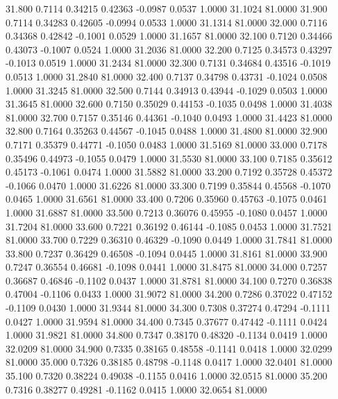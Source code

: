   31.800   0.7114   0.34215   0.42363  -0.0987   0.0537   1.0000  31.1024  81.0000
  31.900   0.7114   0.34283   0.42605  -0.0994   0.0533   1.0000  31.1314  81.0000
  32.000   0.7116   0.34368   0.42842  -0.1001   0.0529   1.0000  31.1657  81.0000
  32.100   0.7120   0.34466   0.43073  -0.1007   0.0524   1.0000  31.2036  81.0000
  32.200   0.7125   0.34573   0.43297  -0.1013   0.0519   1.0000  31.2434  81.0000
  32.300   0.7131   0.34684   0.43516  -0.1019   0.0513   1.0000  31.2840  81.0000
  32.400   0.7137   0.34798   0.43731  -0.1024   0.0508   1.0000  31.3245  81.0000
  32.500   0.7144   0.34913   0.43944  -0.1029   0.0503   1.0000  31.3645  81.0000
  32.600   0.7150   0.35029   0.44153  -0.1035   0.0498   1.0000  31.4038  81.0000
  32.700   0.7157   0.35146   0.44361  -0.1040   0.0493   1.0000  31.4423  81.0000
  32.800   0.7164   0.35263   0.44567  -0.1045   0.0488   1.0000  31.4800  81.0000
  32.900   0.7171   0.35379   0.44771  -0.1050   0.0483   1.0000  31.5169  81.0000
  33.000   0.7178   0.35496   0.44973  -0.1055   0.0479   1.0000  31.5530  81.0000
  33.100   0.7185   0.35612   0.45173  -0.1061   0.0474   1.0000  31.5882  81.0000
  33.200   0.7192   0.35728   0.45372  -0.1066   0.0470   1.0000  31.6226  81.0000
  33.300   0.7199   0.35844   0.45568  -0.1070   0.0465   1.0000  31.6561  81.0000
  33.400   0.7206   0.35960   0.45763  -0.1075   0.0461   1.0000  31.6887  81.0000
  33.500   0.7213   0.36076   0.45955  -0.1080   0.0457   1.0000  31.7204  81.0000
  33.600   0.7221   0.36192   0.46144  -0.1085   0.0453   1.0000  31.7521  81.0000
  33.700   0.7229   0.36310   0.46329  -0.1090   0.0449   1.0000  31.7841  81.0000
  33.800   0.7237   0.36429   0.46508  -0.1094   0.0445   1.0000  31.8161  81.0000
  33.900   0.7247   0.36554   0.46681  -0.1098   0.0441   1.0000  31.8475  81.0000
  34.000   0.7257   0.36687   0.46846  -0.1102   0.0437   1.0000  31.8781  81.0000
  34.100   0.7270   0.36838   0.47004  -0.1106   0.0433   1.0000  31.9072  81.0000
  34.200   0.7286   0.37022   0.47152  -0.1109   0.0430   1.0000  31.9344  81.0000
  34.300   0.7308   0.37274   0.47294  -0.1111   0.0427   1.0000  31.9594  81.0000
  34.400   0.7345   0.37677   0.47442  -0.1111   0.0424   1.0000  31.9821  81.0000
  34.800   0.7347   0.38170   0.48320  -0.1134   0.0419   1.0000  32.0209  81.0000
  34.900   0.7335   0.38165   0.48558  -0.1141   0.0418   1.0000  32.0299  81.0000
  35.000   0.7326   0.38185   0.48798  -0.1148   0.0417   1.0000  32.0401  81.0000
  35.100   0.7320   0.38224   0.49038  -0.1155   0.0416   1.0000  32.0515  81.0000
  35.200   0.7316   0.38277   0.49281  -0.1162   0.0415   1.0000  32.0654  81.0000
